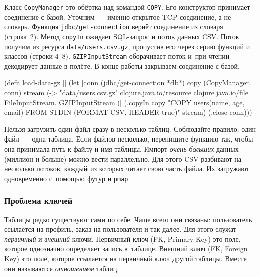 Класс \verb|CopyManager| это обёртка над командой \verb|COPY|. Его конструктор
принимает соединение с базой. Уточним~--- именно открытое TCP-соединение, а не
словарь. Функция \verb|jdbc/get-connection| вернёт соединение из словаря
(строка~2). Метод \verb|copyIn| ожидает SQL-запрос и поток данных CSV. Поток
получим из ресурса \verb|data/users.csv.gz|, пропустив его через серию функций и
классов (строки 4--8). \verb|GZIPInputStream| оборачивает поток и~при чтении
декодирует данные в полёте. В конце работы закрываем соединение с базой.


\begin{english}
  \begin{clojure/lines}
(defn load-data-gz []
  (let [conn (jdbc/get-connection *db*)
        copy (CopyManager. conn)
        stream (-> "data/users.csv.gz"
                   clojure.java.io/resource
                   clojure.java.io/file
                   FileInputStream.
                   GZIPInputStream.)]
    (.copyIn copy "COPY users(name, age, email)
                   FROM STDIN (FORMAT CSV, HEADER true)"
             stream)
    (.close conn)))
  \end{clojure/lines}
\end{english}

Нельзя загрузить один файл сразу в несколько таблиц. Соблюдайте правило: один
файл~--- одна таблица. Если файлов несколько, перепишите функцию так, чтобы она
принимала путь к файлу и имя таблицы. Импорт \emph{очень больших} данных
(миллион и больше) можно вести параллельно. Для этого CSV разбивают на несколько
потоков, каждый из которых читает свою часть файла. Их загружают одновременно
с~помощью футур и \verb|pmap|.

\subsubsection*{Проблема ключей}



Таблицы редко существуют сами по себе. Чаще всего они связаны: пользователь
ссылается на профиль, заказ на пользователя и так далее. Для этого служат
\emph{первичный} и \emph{внешний} ключи. Первичный ключ (PK, Primary Key) это
поле, которое однозначно определяет запись в~таблице. Внешний ключ (FK, Foreign
Key) это поле, которое ссылается на первичный ключ другой таблицы. Вместе они
называются \emph{отношением} таблиц.

